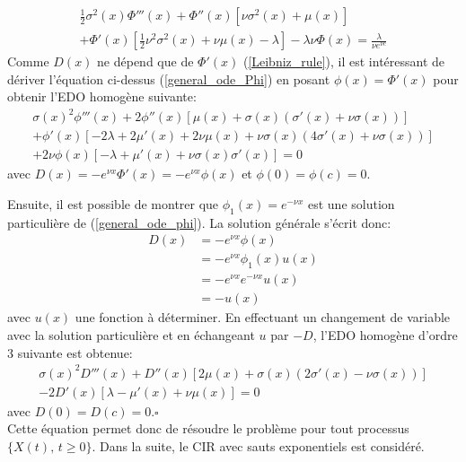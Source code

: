 \begin{equation}\label{general_ode_Phi}
    \begin{aligned}
        \frac{1}{2}\sigma^2(x)\Phi'''(x)+\Phi''(x)\left[\nu\sigma^2(x)+\mu(x)\right]\\+\Phi'(x)\left[\frac{1}{2}\nu^2\sigma^2(x)+\nu\mu(x)-\lambda\right]-\lambda\nu\Phi(x)=\frac{\lambda}{\nu e^{\nu c}}
    \end{aligned}
\end{equation}
Comme $D(x)$ ne dépend que de $\Phi'(x)$ (\ref{Leibniz_rule}), il est intéressant de dériver l'équation ci-dessus (\ref{general_ode_Phi}) en posant $\phi(x)=\Phi'(x)$ pour obtenir l'\acs{EDO} homogène suivante:
\begin{equation}\label{general_ode_phi}
    \begin{aligned}
        \sigma(x)^2 \phi'''(x)+2 \phi''(x) \left[\mu(x)+\sigma(x) \left(\sigma'(x)+\nu  \sigma(x)\right)\right]\\+\phi'(x) \left[-2 \lambda +2 \mu'(x)+2 \nu\mu(x)+\nu  \sigma(x) \left(4 \sigma'(x)+\nu  \sigma(x)\right)\right]\\+2 \nu  \phi(x) \left[-\lambda +\mu'(x)+\nu  \sigma(x) \sigma'(x)\right]=0
    \end{aligned}
\end{equation}
avec $D(x)=-e^{\nu x}\Phi'(x)=-e^{\nu x}\phi(x)$ et $\phi(0)=\phi(c)=0$.

Ensuite, il est possible de montrer que $\phi_1(x)=e^{-\nu x}$ est une solution particulière de (\ref{general_ode_phi}). La solution générale s'écrit donc: 
\[
\begin{aligned}
    D(x)&=-e^{\nu x}\phi(x)\\
    &=-e^{\nu x}\phi_1(x)u(x)\\
    &=-e^{\nu x}e^{-\nu x}u(x)\\
    &=-u(x)
\end{aligned}
\]
avec $u(x)$ une fonction à déterminer. En effectuant un changement de variable avec la solution particulière et en échangeant $u$ par $-D$, l'\acs{EDO} homogène d'ordre 3 suivante est obtenue: 
\[
    \begin{aligned}
        \sigma(x)^2 D'''(x)+D''(x) \left[2 \mu(x)+\sigma(x)(2\sigma'(x)-\nu  \sigma(x))\right]\\-2D'(x)[\lambda-\mu'(x)+\nu\mu(x)]=0
    \end{aligned}
\]
avec $D(0)=D(c)=0$.\hfill$\square$\\

Cette équation permet donc de résoudre le problème pour tout processus \(\{X(t),\,t\geq0\}\). Dans la suite, le \acs{CIR} avec sauts exponentiels est considéré.
